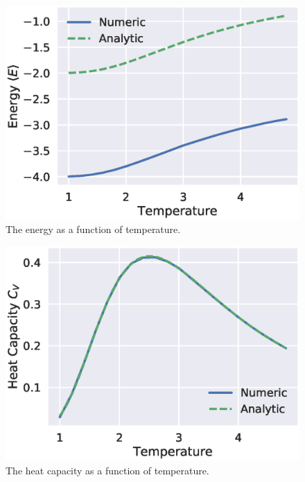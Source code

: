 \documentclass[aps,reprint]{revtex4-1}
\begin{document}
\begin{figure}[H]
  \centering
  \includegraphics[width=\columnwidth]{figures/4bEnergy.eps}
  \caption{The energy as a function of temperature.}
  \label{fig:4be}
\end{figure}
\begin{figure}[H]
  \centering
  \includegraphics[width=\columnwidth]{figures/4bHeatCapacity.eps}
  \caption{The heat capacity as a function of temperature.}
  \label{fig:4bcv}
\end{figure}
\end{document}
